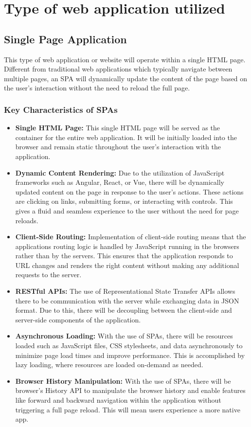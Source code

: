 \documentclass{article}
\begin{document}
\section{Type of web application utilized}
\subsection{Single Page Application}
This type of web application or website will operate within a single HTML page. Different from traditional web applications which typically navigate between multiple pages, an SPA will dynamically update the content of the page based on the user’s interaction without the need to reload the full page.
\subsubsection{Key Characteristics of SPAs}
\begin{itemize}
    \item \textbf{Single HTML Page:} This single HTML page will be served as the container for the entire web application. It will be initially loaded into the browser and remain static throughout the user’s interaction with the application.
    \item \textbf{Dynamic Content Rendering:} Due to the utilization of JavaScript frameworks such as Angular, React, or Vue, there will be dynamically updated content on the page in response to the user’s actions. These actions are clicking on links, submitting forms, or interacting with controls. This gives a fluid and seamless experience to the user without the need for page reloads.
    \item \textbf{Client-Side Routing:} Implementation of client-side routing means that the applications routing logic is handled by JavaScript running in the browsers rather than by the servers. This ensures that the application responds to URL changes and renders the right content without making any additional requests to the server.
    \item \textbf{RESTful APIs:} The use of Representational State Transfer APIs allows there to be communication with the server while exchanging data in JSON format. Due to this, there will be decoupling between the client-side and server-side components of the application.
    \item \textbf{Asynchronous Loading:} With the use of SPAs, there will be resources loaded such as JavaScript files, CSS stylesheets, and data asynchronously to minimize page load times and improve performance. This is accomplished by lazy loading, where resources are loaded on-demand as needed.
    \item \textbf{Browser History Manipulation:} With the use of SPAs, there will be browser’s History API to manipulate the browser history and enable features like forward and backward navigation within the application without triggering a full page reload. This will mean users experience a more native app.
\end{itemize}
\end{document}
